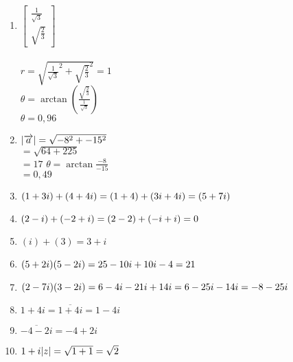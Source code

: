 \documentclass[a4paper]{article}
\begin{document}
\begin{enumerate}[1.]
        \item $\begin{bmatrix}\frac{1}{\sqrt{3}} \\ \sqrt{\frac{2}{3}}\end{bmatrix}$\\\\
        $r = \sqrt{\frac{1}{\sqrt{3}}^2 + \sqrt{\frac{2}{3}}^2}= 1$\\
        $\theta = \arctan (\frac{\sqrt{\frac{2}{3}}}{\frac{1}{\sqrt{3}}})$\\
        $\theta=0,96$

        \item $\abs{\overrightarrow{a}} = \sqrt{-8^2 + -15^2}$\\
        $= \sqrt{64 + 225}$\\
        $= 17$
        $\theta = \arctan{\frac{-8}{-15}}$\\
        $= 0,49$

        \item $(1+3i)+(4+4i)\\
        =(1+4)+(3i+4i)\\
        =(5+7i)$

        \item $(2-i)+(-2+i)\\
        =(2-2)+(-i+i)\\
        =0$

        \item $(i)+(3) = 3+i$
        
        \item $(5+2i)(5-2i)\\
        = 25 -10i +10i -4\\
        =21
        $

        \item $(2-7i)(3-2i)\\
        =6-4i-21i+14i\\
        =6-25i-14i\\
        =-8-25i
        $

        \item $1+4i
        =\overline{1+4i}
        =1-4i$

        \item $\overline{-4-2i} = -4+2i$
        
        \item $1+i\\
        \abs{z} = \sqrt{1+1}\\
        = \sqrt{2}
        $


\end{enumerate}
\end{document}
